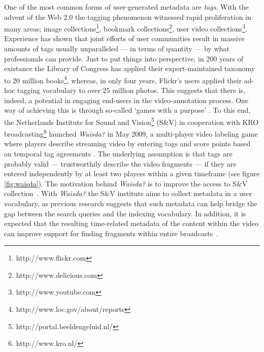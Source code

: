 One of the most common forms of user-generated metadata are \textit{tags}. With the advent of the Web 2.0 the tagging phenomenon witnessed rapid proliferation in many
areas; image collections\footnote{http://www.flickr.com}, bookmark collections\footnote{http://www.delicious.com}, user video collections\footnote{http://www.youtube.com}. Experience has shown that joint efforts of user communities result in massive amounts of tags usually unparalleled --- in terms of quantity --- by what professionals can provide. Just to put things into perspective, in 200 years of existance the Library of Congress has applied their expert-maintained taxonomy to 20 million books\footnote{http://www.loc.gov/about/reports}, whereas, in only four years, Flickr's users applied their ad-hoc tagging vocabulary to over 25 million photos. This suggests that there is, indeed, a potential in engaging end-users in the video-annotation process. One way of achieving this is through so-called `games with a purpose' \cite{gwap}. To this end, the Netherlands Institute for Sound and Vision\footnote{http://portal.beeldengeluid.nl/} (S\&V) in cooperation with KRO broadcasting\footnote{http://www.kro.nl/} launched \textit{Waisda?} in May 2009, a multi-player video labeling game where players describe streaming video by entering tags and score points based on temporal tag agreements . The underlying assumption is that tags are probably valid --- trustworthily describe the video fragments --- if they are entered independently by at least two players within a given timeframe (see figure \ref{fig:waisda}). The motivation behind \textit{Waisda?} is to improve the access to S\&V collection~\cite{johanwebsci}. With \textit{Waisda?} the S\&V institute aims to collect metadata in a user vocabulary, as previous research \cite{Jorgensen2007} suggests that such metadata can help bridge the gap between the search queries and the indexing vocabulary. In addition, it is expected that the resulting time-related metadata of the content within the video can improve support for finding fragments within entire broadcasts~\cite{bouke}.

